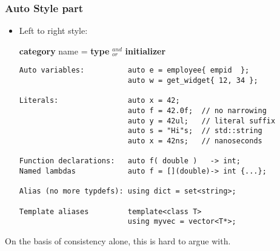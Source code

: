 \begin{frame}[fragile]
\frametitle{Auto Style part }
\begin{itemize}[<+->]

\item Left to right style: 

\begin{center}{\bf category} name = {\bf type}
  $^{and}_{or}$ {\bf initializer} \end{center}
{\scriptsize \begin{verbatim}
Auto variables:          auto e = employee{ empid  };
                         auto w = get_widget{ 12, 34 };

Literals:                auto x = 42;     
                         auto f = 42.0f;  // no narrowing
                         auto y = 42ul;   // literal suffix
                         auto s = "Hi"s;  // std::string
                         auto x = 42ns;   // nanoseconds

Function declarations:   auto f( double )   -> int; 
Named lambdas            auto f = [](double)-> int {...};

Alias (no more typdefs): using dict = set<string>;

Template aliases         template<class T>
                         using myvec = vector<T*>;
\end{verbatim} }
\end{itemize} %
\begin{center}On the basis of consistency alone, this is hard to argue
  with.\end{center}
\end{frame}

